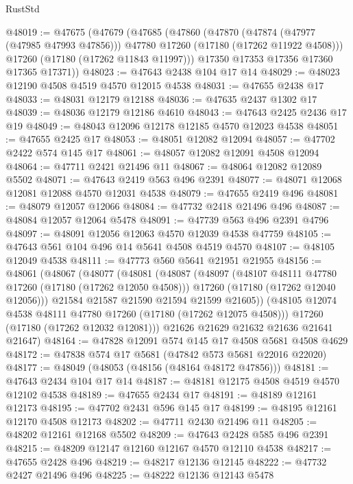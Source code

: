 \begin{lexlean}{RustStd}
\begin{coremodule}
{\begin{coremodule}
{{{{{{{{{{{{{{{{{{{{{{{{{{{{{{{{{{{{{{{{{{{{{{{{{{{{{{{@48019 := @47675
    (@47679
      (@47685
        (@47860
          (@47870
            (@47874 (@47977 (@47985 @47993 @47856)))
            @47780
            @17260
            (@17180 (@17262 @11922 @4508)))
          @17260
          (@17180 (@17262 @11843 @11997)))
        @17350
        @17353
        @17356
        @17360
        @17365
        @17371))
@48023 := @47643 @2438 @104 @17 @14
@48029 := @48023 @12190 @4508 @4519 @4570 @12015 @4538
@48031 := @47655 @2438 @17
@48033 := @48031 @12179 @12188
@48036 := @47635 @2437 @1302 @17
@48039 := @48036 @12179 @12186 @4610
@48043 := @47643 @2425 @2436 @17 @19
@48049 := @48043 @12096 @12178 @12185 @4570 @12023 @4538
@48051 := @47655 @2425 @17
@48053 := @48051 @12082 @12094
@48057 := @47702 @2422 @574 @145 @17
@48061 := @48057 @12082 @12091 @4508 @12094
@48064 := @47711 @2421 @21496 @11
@48067 := @48064 @12082 @12089 @5502
@48071 := @47643 @2419 @563 @496 @2391
@48077 := @48071 @12068 @12081 @12088 @4570 @12031 @4538
@48079 := @47655 @2419 @496
@48081 := @48079 @12057 @12066
@48084 := @47732 @2418 @21496 @496
@48087 := @48084 @12057 @12064 @5478
@48091 := @47739 @563 @496 @2391 @4796
@48097 := @48091 @12056 @12063 @4570 @12039 @4538 @47759
@48105 := @47643 @561 @104 @496 @14 @5641 @4508 @4519 @4570
@48107 := @48105 @12049 @4538
@48111 := @47773 @560 @5641 @21951 @21955
@48156 := @48061
    (@48067
      (@48077
        (@48081
          (@48087
            (@48097
              (@48107 @48111 @47780 @17260 (@17180 (@17262 @12050 @4508)))
              @17260
              (@17180 (@17262 @12040 @12056)))
            @21584
            @21587
            @21590
            @21594
            @21599
            @21605))
        (@48105 @12074 @4538 @48111 @47780 @17260 (@17180 (@17262 @12075 @4508)))
        @17260
        (@17180 (@17262 @12032 @12081)))
      @21626
      @21629
      @21632
      @21636
      @21641
      @21647)
@48164 := @47828 @12091 @574 @145 @17 @4508 @5681 @4508 @4629
@48172 := @47838 @574 @17 @5681 (@47842 @573 @5681 @22016 @22020)
@48177 := @48049 (@48053 (@48156 (@48164 @48172 @47856)))
@48181 := @47643 @2434 @104 @17 @14
@48187 := @48181 @12175 @4508 @4519 @4570 @12102 @4538
@48189 := @47655 @2434 @17
@48191 := @48189 @12161 @12173
@48195 := @47702 @2431 @596 @145 @17
@48199 := @48195 @12161 @12170 @4508 @12173
@48202 := @47711 @2430 @21496 @11
@48205 := @48202 @12161 @12168 @5502
@48209 := @47643 @2428 @585 @496 @2391
@48215 := @48209 @12147 @12160 @12167 @4570 @12110 @4538
@48217 := @47655 @2428 @496
@48219 := @48217 @12136 @12145
@48222 := @47732 @2427 @21496 @496
@48225 := @48222 @12136 @12143 @5478
}}}}}}}}}}}}}}}}}}}}}}}}}}}}}}}}}}}}}}}}}}}}}}}}}}}}}}}
\end{coremodule}}
\end{coremodule}
\end{lexlean}
